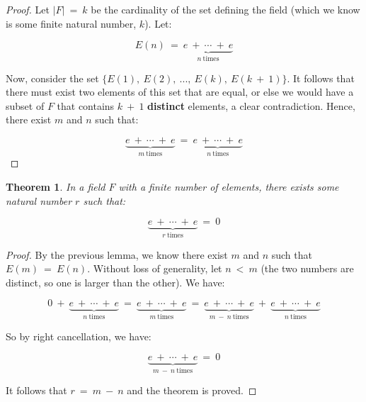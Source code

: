 \documentclass[10pt, oneside]{article}
\newtheorem{thm}{Theorem}
\begin{document}
\begin{proof}
  Let $|F| \ = \ k$ be the cardinality of the set defining the field (which we know is some finite natural number, $k$). Let:

  $$E(n) \ = \ \underbrace{e \ + \ \cdots \ + \ e}_{n \ \text{times}}$$

  Now, consider the set $\{E(1), \ E(2), \ ..., \ E(k), \ E(k \ + \ 1)\}$. It follows that there must exist two elements of
  this set that are equal, or else we would have a subset of $F$ that contains $k \ + \ 1$ \textbf{distinct} elements, a clear contradiction.
  Hence, there exist $m$ and $n$ such that:

  $$\underbrace{e \ + \ \cdots \ + \ e}_{m \ \text{times}} \ = \ \underbrace{e \ + \ \cdots \ + \ e}_{n \ \text{times}}$$

\end{proof}

\begin{thm}
  In a field $F$ with a finite number of elements, there exists some natural number $r$ such that:

  $$\underbrace{e \ + \ \cdots \ + \ e}_{r \ \text{times}} \ = \ 0$$
\end{thm}

\begin{proof}
  By the previous lemma, we know there exist $m$ and $n$ such that $E(m) \ = \ E(n)$. Without loss of generality, let $n \ < \ m$ (the two numbers
  are distinct, so one is larger than the other). We have:

  $$0 \ + \ \underbrace{e \ + \ \cdots \ + \ e}_{n \ \text{times}} \ = \ \underbrace{e \ + \ \cdots \ + \ e}_{m \ \text{times}} \ = \ \underbrace{e \ + \ \cdots \ + \ e}_{m \ - \ n \ \text{times}} \ + \
  \underbrace{e \ + \ \cdots \ + \ e}_{n \ \text{times}}$$

  So by right cancellation, we have:

  $$\underbrace{e \ + \ \cdots \ + \ e}_{m \ - \ n \ \text{times}} \ = \ 0$$

  It follows that $r \ = \ m \ - \ n$ and the theorem is proved.
  \end{proof}
\end{document}
